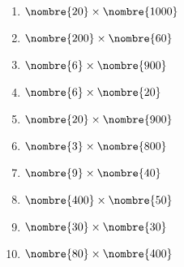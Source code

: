 

\begin{multicols}{2}
\begin{enumerate}
	\item $\nombre{20} \times \nombre{1000}$
	\item $\nombre{200} \times \nombre{60}$
	\item $\nombre{6} \times \nombre{900}$
	\item $\nombre{6} \times \nombre{20}$
	\item $\nombre{20} \times \nombre{900}$
	\item $\nombre{3} \times \nombre{800}$
	\item $\nombre{9} \times \nombre{40}$
	\item $\nombre{400} \times \nombre{50}$
	\item $\nombre{30} \times \nombre{30}$
	\item $\nombre{80} \times \nombre{400}$
\end{enumerate}

\end{multicols}